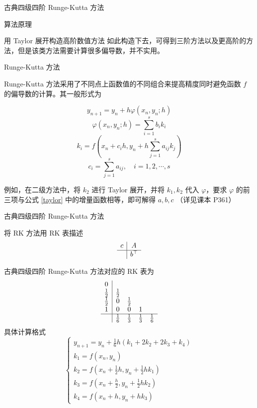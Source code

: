 \documentclass[a4paper]{article}
\begin{document}
\begin{multicols}{2}
\begin{section}{古典四级四阶 Runge-Kutta 方法}
\begin{subsection}{算法原理}
\begin{subsubsection}{用 Taylor 展开构造高阶数值方法}
			如此构造下去，可得到三阶方法以及更高阶的方法，但是该类方法需要计算很多偏导数，并不实用。
			
		\end{subsubsection}
		
		\begin{subsubsection}{Runge-Kutta 方法}
		
			Runge-Kutta 方法采用了不同点上函数值的不同组合来提高精度同时避免函数 $f$ 的偏导数的计算。其一般形式为 
			
			$$y_{n+1}=y_{n}+h \varphi\left(x_{n}, y_{n} ; h\right)$$ $$\varphi\left(x_{n}, y_{n} ; h\right)=\sum_{i=1}^{s} b_{i} k_{i}$$ $$k_{i}=f\left(x_{n}+c_{i} h, y_{n}+h \sum_{j=1}^{s} a_{i j} k_{j}\right)$$ $$c_{i}=\sum_{j=1}^{s} a_{i j}, \quad i=1,2, \cdots, s$$
			
			例如，在二级方法中，将 $k_2$ 进行 Taylor 展开，并将 $k_1, k_2$ 代入 $\varphi$，要求 $\varphi$ 的前三项与公式 \ref{taylor} 中的增量函数相等，即可解得 $a, b, c$ （详见课本 P361）
			
		\end{subsubsection}

		\begin{subsubsection}{古典四级四阶 Runge-Kutta 方法}
		
			将 RK 方法用 RK 表描述 $$ \begin{array}{c|c}{c} & {A} \\ \hline & {b^{\top}}\end{array} $$ 
			
			古典四级四阶 Runge-Kutta 方法对应的 RK 表为 $$
			\begin{array}{c|cccc}{0} & {} & {} & {} & {} \\ {\frac{1}{2}} & {\frac{1}{2}} & {} & {} & {} \\ 
				{\frac{1}{2}} & {0} & {\frac{1}{2}} & {} & {} \\ 
				{1} & {0} & {0} & {1} & {} \\ \hline 
				{} & {1\over 6} & {1\over 3} & {1\over 3} & {1\over 6} \end{array}
			$$ 具体计算格式 $$
			\left\{\begin{array}{l}{y_{n+1}=y_{n}+\frac{1}{6} h\left(k_{1}+2 k_{2}+2 k_{3}+k_{4}\right)} \\ {k_{1}=f\left(x_{n}, y_{n}\right)} \\ {k_{2}=f\left(x_{n}+\frac{1}{2} h, y_{n}+\frac{1}{2} h k_{1}\right)} \\ {k_{3}=f\left(x_{n}+\frac{h}{2}, y_{n}+\frac{1}{2} h k_{2}\right)} \\ {k_{4}=f\left(x_{n}+h, y_{n}+h k_{3}\right)}\end{array}\right. $$
			

\end{subsubsection}
\end{subsection}
\end{section}
\end{multicols}
\end{document}

